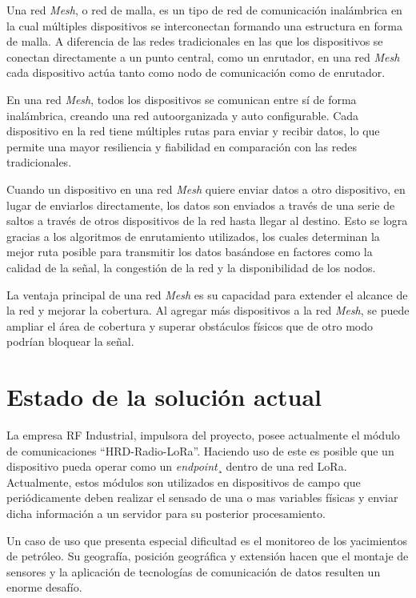 Una red \emph{Mesh}, o red de malla, es un tipo de red de comunicación inalámbrica en la cual múltiples dispositivos se interconectan formando una estructura en forma de malla. A diferencia de las redes tradicionales en las que los dispositivos se conectan directamente a un punto central, como un enrutador, en una red \emph{Mesh} cada dispositivo actúa tanto como nodo de comunicación como de enrutador.

En una red \emph{Mesh}, todos los dispositivos se comunican entre sí de forma inalámbrica, creando una red autoorganizada y auto configurable. Cada dispositivo en la red tiene múltiples rutas para enviar y recibir datos, lo que permite una mayor resiliencia y fiabilidad en comparación con las redes tradicionales.

Cuando un dispositivo en una red \emph{Mesh} quiere enviar datos a otro dispositivo, en lugar de enviarlos directamente, los datos son enviados a través de una serie de saltos a través de otros dispositivos de la red hasta llegar al destino. Esto se logra gracias a los algoritmos de enrutamiento utilizados, los cuales determinan la mejor ruta posible para transmitir los datos basándose en factores como la calidad de la señal, la congestión de la red y la disponibilidad de los nodos.

La ventaja principal de una red \emph{Mesh} es su capacidad para extender el alcance de la red y mejorar la cobertura. Al agregar más dispositivos a la red \emph{Mesh}, se puede ampliar el área de cobertura y superar obstáculos físicos que de otro modo podrían bloquear la señal.\citep{WEBSITE:9}


\section{Estado de la solución actual}

La empresa RF Industrial, impulsora del proyecto, posee actualmente el módulo de comunicaciones “HRD-Radio-LoRa”. Haciendo uso de este es posible que un dispositivo pueda operar como un \emph{endpoint}¸ dentro de una red LoRa. Actualmente, estos módulos son utilizados en dispositivos de campo que periódicamente deben realizar el sensado de una o mas variables físicas y enviar dicha información a un servidor para su posterior procesamiento. 

Un caso de uso que presenta especial dificultad es el monitoreo de los yacimientos de petróleo. Su geografía, posición geográfica y extensión hacen que el montaje de sensores y la aplicación de tecnologías de comunicación de datos resulten un enorme desafío.
 

